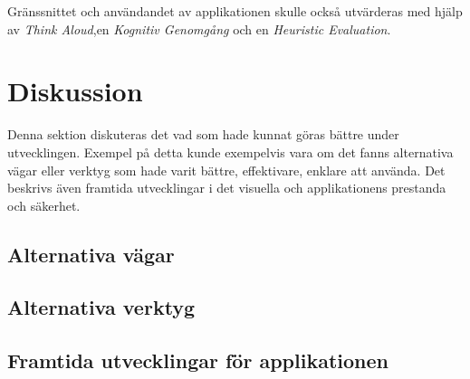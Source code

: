 \documentclass[a4paper, 11pt]{article}
\begin{document}
Gränssnittet och användandet av applikationen skulle också utvärderas med hjälp av \textit{Think Aloud},en \textit{Kognitiv Genomgång} och en \textit{Heuristic Evaluation}.

\section{Diskussion}
Denna sektion diskuteras det vad som hade kunnat göras bättre under utvecklingen. Exempel på detta kunde exempelvis vara om det fanns alternativa vägar eller verktyg som hade varit bättre, effektivare, enklare att använda. Det beskrivs även framtida utvecklingar i det visuella och applikationens prestanda och säkerhet.

\subsection{Alternativa vägar}

\subsection{Alternativa verktyg}

\subsection{Framtida utvecklingar för applikationen}



\newpage
\printbibliography[title={Referenser}]
\end{document}

